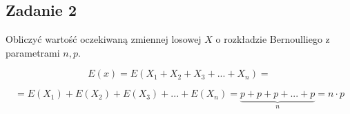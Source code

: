 \subsection{Zadanie 2}

Obliczyć wartość oczekiwaną zmiennej losowej $X$ o rozkładzie Bernoulliego z parametrami $n,p$.

$$
E(x) = E(X_{1} + X_{2} + X_{3} + ... + X_{n}) = 
$$
 
$$
= E(X_{1}) + E(X_{2}) + E(X_{3}) + ... + E(X_{n}) = 
\underbrace{p + p + p + ... + p}_{n} = n \cdot p
$$
